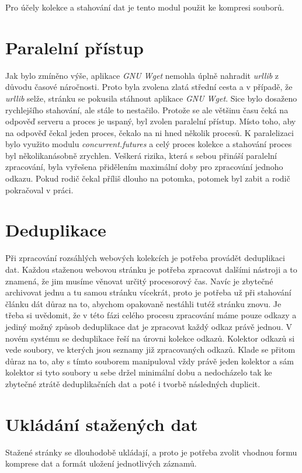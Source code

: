 Pro účely kolekce a stahování dat je tento modul použit ke kompresi souborů.

\section{Paralelní přístup}
Jak bylo zmíněno výše, aplikace \textit{GNU Wget} nemohla úplně nahradit \textit{urllib} z důvodu časové náročnosti. Proto byla zvolena zlatá střední cesta a v případě,
že \textit{urllib} selže, stránku se pokusila stáhnout aplikace \textit{GNU Wget}. Sice bylo dosaženo rychlejšího stahování, ale stále to nestačilo. Protože se ale většinu
času čeká na odpověď serveru a proces je uspaný, byl zvolen paralelní přístup. Místo toho, aby na odpověď čekal jeden proces, čekalo na ni
hned několik procesů. K paralelizaci bylo využito modulu \textit{concurrent.futures} a celý proces kolekce a stahování proces byl několikanásobně zrychlen. Veškerá rizika,
která s sebou přináší paralelní zpracování, byla vyřešena přidělením maximální doby pro zpracování jednoho odkazu. Pokud rodič čekal příliš
dlouho na potomka, potomek byl zabit a rodič pokračoval v práci.


\section{Deduplikace}
Při zpracování rozsáhlých webových kolekcích je potřeba provádět deduplikaci dat. Každou staženou webovou stránku je potřeba zpracovat
dalšími nástroji a to znamená, že jim musíme věnovat určitý procesorový čas. Navíc je zbytečné archivovat jednu a tu samou stránku
vícekrát, proto je potřeba už při stahování článku dát důraz na to, abychom opakovaně nestáhli tutéž stránku znovu.
Je třeba si uvědomit, že v této fázi celého procesu zpracování máme pouze odkazy a jediný možný způsob deduplikace dat je zpracovat každý
odkaz právě jednou. V novém systému se deduplikace řeší na úrovni kolekce odkazů. Kolektor odkazů si vede soubory, ve kterých jsou seznamy již
zpracovaných odkazů. Klade se přitom důraz na to, aby s tímto souborem manipuloval vždy právě jeden kolektor a sám kolektor si tyto soubory
u sebe držel minimální dobu a nedocházelo tak ke zbytečné ztrátě deduplikačních dat a poté i tvorbě následných duplicit.

\section{Ukládání stažených dat}
Stažené stránky se dlouhodobě ukládají, a proto je potřeba zvolit vhodnou formu komprese dat a formát uložení jednotlivých záznamů.

